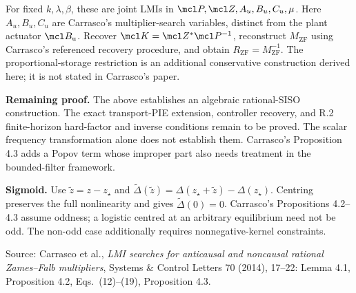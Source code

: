 For fixed \(k,\lambda,\beta\), these are joint LMIs in
\(\mcl P,\mcl Z,A_u,B_u,C_u,\mu\).
Here \(A_u,B_u,C_u\) are Carrasco's multiplier-search variables,
distinct from the plant actuator \(\mcl B_{\mathrm u}\).
Recover \(\mcl K=\mcl Z^*\mcl P^{-1}\), reconstruct
\(M_{\mathrm{ZF}}\) using Carrasco's referenced recovery procedure,
and obtain \(R_{\mathrm{ZF}}=M_{\mathrm{ZF}}^{-1}\).
The proportional-storage restriction is an additional conservative
construction derived here; it is not stated in Carrasco's paper.

\textbf{Remaining proof.}
The above establishes an algebraic rational-SISO construction.
The exact transport-PIE extension, controller recovery, and R.2
finite-horizon hard-factor and inverse conditions remain to be proved.
The scalar frequency transformation alone does not establish them.
Carrasco's Proposition 4.3 adds a Popov term whose improper part also
needs treatment in the bounded-filter framework.

\textbf{Sigmoid.}
Use \(\widetilde z=z-z_\star\) and
\(\widetilde\Delta(\widetilde z)
=\Delta(z_\star+\widetilde z)-\Delta(z_\star)\).
Centring preserves the full nonlinearity and gives
\(\widetilde\Delta(0)=0\).
Carrasco's Propositions 4.2--4.3 assume oddness; a logistic centred
at an arbitrary equilibrium need not be odd.
The non-odd case additionally requires nonnegative-kernel constraints.

Source: Carrasco et al., \emph{LMI searches for anticausal and noncausal
rational Zames--Falb multipliers}, Systems \& Control Letters 70 (2014),
17--22: Lemma 4.1, Proposition 4.2, Eqs.~(12)--(19), Proposition 4.3.

